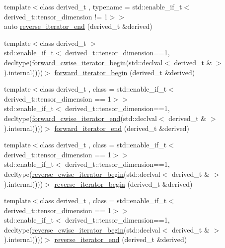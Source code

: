 \begin{DoxyCompactItemize}
{\footnotesize template$<$class derived\+\_\+t , typename  = std\+::enable\+\_\+if\+\_\+t$<$derived\+\_\+t\+::tensor\+\_\+dimension != 1$>$$>$ }\\auto \hyperlink{namespaceBC_1_1tensors_1_1iterators_a007c55271cb17d64e851de767c749ff2}{reverse\+\_\+iterator\+\_\+end} (derived\+\_\+t \&derived)
\item 
{\footnotesize template$<$class derived\+\_\+t $>$ }\\std\+::enable\+\_\+if\+\_\+t$<$ derived\+\_\+t\+::tensor\+\_\+dimension==1, decltype(\hyperlink{namespaceBC_1_1tensors_1_1iterators_a6176b0cf4da76fbafd60f493b45814b0}{forward\+\_\+cwise\+\_\+iterator\+\_\+begin}(std\+::declval$<$ derived\+\_\+t \& $>$).internal()))$>$ \hyperlink{namespaceBC_1_1tensors_1_1iterators_ad0a59cf776bca37d50e6706951ea6e8d}{forward\+\_\+iterator\+\_\+begin} (derived\+\_\+t \&derived)
\item 
{\footnotesize template$<$class derived\+\_\+t , class  = std\+::enable\+\_\+if\+\_\+t$<$derived\+\_\+t\+::tensor\+\_\+dimension == 1$>$$>$ }\\std\+::enable\+\_\+if\+\_\+t$<$ derived\+\_\+t\+::tensor\+\_\+dimension==1, decltype(\hyperlink{namespaceBC_1_1tensors_1_1iterators_ae72d661f81f196fcbc45595a700a4d2d}{forward\+\_\+cwise\+\_\+iterator\+\_\+end}(std\+::declval$<$ derived\+\_\+t \& $>$).internal()))$>$ \hyperlink{namespaceBC_1_1tensors_1_1iterators_aa282275b7b61157d406c3eda2ea7f5d4}{forward\+\_\+iterator\+\_\+end} (derived\+\_\+t \&derived)
\item 
{\footnotesize template$<$class derived\+\_\+t , class  = std\+::enable\+\_\+if\+\_\+t$<$derived\+\_\+t\+::tensor\+\_\+dimension == 1$>$$>$ }\\std\+::enable\+\_\+if\+\_\+t$<$ derived\+\_\+t\+::tensor\+\_\+dimension==1, decltype(\hyperlink{namespaceBC_1_1tensors_1_1iterators_ab8fc7eb8a6e8fe8b12c5e80a28c92e45}{reverse\+\_\+cwise\+\_\+iterator\+\_\+begin}(std\+::declval$<$ derived\+\_\+t \& $>$).internal()))$>$ \hyperlink{namespaceBC_1_1tensors_1_1iterators_a98754e5280ee11b247af40b121e743c1}{reverse\+\_\+iterator\+\_\+begin} (derived\+\_\+t \&derived)
\item 
{\footnotesize template$<$class derived\+\_\+t , class  = std\+::enable\+\_\+if\+\_\+t$<$derived\+\_\+t\+::tensor\+\_\+dimension == 1$>$$>$ }\\std\+::enable\+\_\+if\+\_\+t$<$ derived\+\_\+t\+::tensor\+\_\+dimension==1, decltype(\hyperlink{namespaceBC_1_1tensors_1_1iterators_ab8fc7eb8a6e8fe8b12c5e80a28c92e45}{reverse\+\_\+cwise\+\_\+iterator\+\_\+begin}(std\+::declval$<$ derived\+\_\+t \& $>$).internal()))$>$ \hyperlink{namespaceBC_1_1tensors_1_1iterators_a1f5e6689890c459441951a4bbce19e8b}{reverse\+\_\+iterator\+\_\+end} (derived\+\_\+t \&derived)
\end{DoxyCompactItemize}


